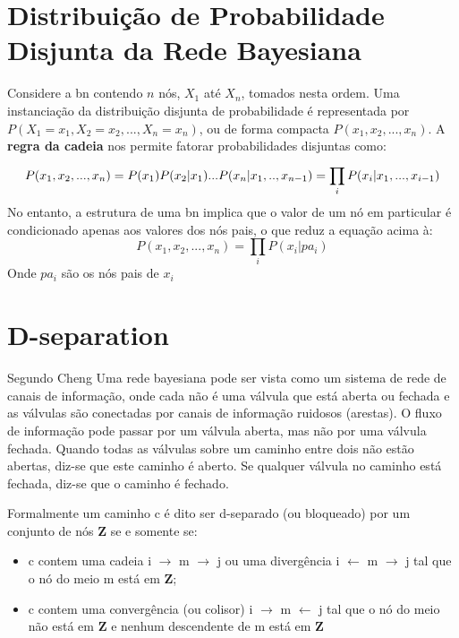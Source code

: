 \section{Distribuição de Probabilidade Disjunta da Rede Bayesiana}
Considere a \gls{bn} contendo $n$ nós, $X_1$ até $X_n$, tomados nesta ordem. Uma instanciação da distribuição disjunta de probabilidade é representada por $P(X_1 = x_1, X_2 = x_2, ... , X_n = x_n)$, ou de forma compacta $P(x_1, x_2, ..., x_n)$. A \textbf{regra da cadeia} nos permite fatorar probabilidades disjuntas como:
\begin{equation}
	P(x_1, x_2, ..., x_n) = P(x_1)P(x_2|x_1)...P(x_n|x_1,..,x_{n-1})\\
	= \prod_{i}^{}P(x_i|x_1,...,x_{i-1})
\end{equation}
No entanto, a estrutura de uma \gls{bn} implica que o valor de um nó em particular é condicionado apenas aos valores dos nós pais, o que reduz a equação acima à:
\begin{equation}\label{eq:pearl}
P(x_1, x_2, ..., x_n) = \prod_i P(x_i|pa_i)
\end{equation}
Onde $pa_i$ são os nós pais de $x_i$

\section{D-separation}
Segundo Cheng\cite{cheng02} Uma rede bayesiana pode ser vista como um sistema de rede de canais de informação, onde cada não é uma válvula que está aberta ou fechada e as válvulas são conectadas por canais de informação ruidosos (arestas). O fluxo de informação pode passar por um válvula aberta, mas não por uma válvula fechada. Quando todas as válvulas sobre um caminho entre dois não estão abertas, diz-se que este caminho é aberto. Se qualquer válvula no caminho está fechada, diz-se que o caminho é fechado.

Formalmente um caminho c é dito ser d-separado (ou bloqueado) por um conjunto de nós \textbf{Z} se e somente se:
\begin{itemize}
	\item c contem uma cadeia i $\rightarrow$ m $\rightarrow$ j ou uma divergência i $\leftarrow$ m $\rightarrow$ j tal que o nó do meio m está em \textbf{Z};
	\item c contem uma convergência (ou colisor) i $\rightarrow$ m $\leftarrow$ j tal que o nó do meio não está em $\textbf{Z}$ e nenhum descendente de m está em $\textbf{Z}$
\end{itemize}

